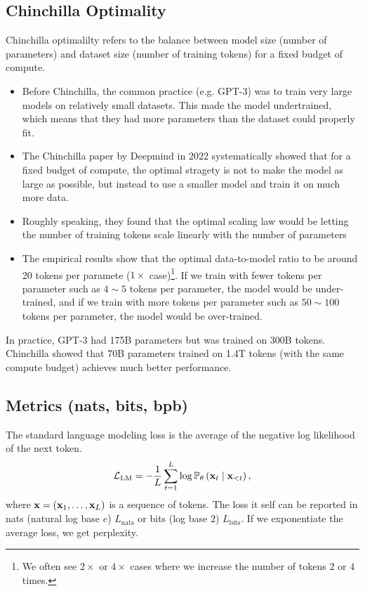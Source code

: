 \documentclass[11pt]{article}  %
\begin{document}
\subsection{Chinchilla Optimality}
Chinchilla optimalilty refers to the balance between model size (number of parameters) and dataset size (number of training tokens) for a fixed budget of compute.
\begin{itemize}
  \item Before Chinchilla, the common practice (e.g. GPT-3) was to train very large models on relatively small datasets. This made the model undertrained, which means that they had more parameters than the dataset could properly fit.
  \item The Chinchilla paper by Deepmind in 2022 systematically showed that for a fixed budget of compute, the optimal stragety is not to make the model as large as possible, but instead to use a smaller model and train it on much more data.
  \item Roughly speaking, they found that the optimal scaling law would be letting the number of training tokens scale linearly with the number of parameters
  \item The empirical results show that the optimal data-to-model ratio to be around 20 tokens per paramete ($1\times$ case)\footnote{We often see $2\times$ or $4\times$ cases where we increase the number of tokens $2$ or $4$ times.}.
  If we train with fewer tokens per parameter such as $4 \sim 5$ tokens per parameter, the model would be under-trained, and if we train with more tokens per parameter such as $50 \sim 100$ tokens per parameter, the model would be over-trained.
\end{itemize}

In practice, GPT-3 had 175B parameters but was trained on 300B tokens.
Chinchilla showed that 70B parameters trained on 1.4T tokens (with the same compute budget) achieves much better performance.


\subsection{Metrics (nats, bits, bpb)}
The standard language modeling loss is the average of the negative log likelihood of the next token.
\begin{align*}
  \mathcal{L}_{\text{LM}} = -\frac{1}{L}\sum_{t=1}^{L}\log\mathbb{P}_{\theta}\left( \mathbf{x}_t \mid \mathbf{x}_{< t} \right),
\end{align*}
where $\mathbf{x} = (\mathbf{x}_1, \hdots, \mathbf{x}_L)$ is a sequence of tokens.
The loss it self can be reported in nats (natural log base $e$) $L_{\text{nats}}$ or bits (log base $2$) $L_{\text{bits}}$.
If we exponentiate the average loss, we get perplexity.
\end{document}
